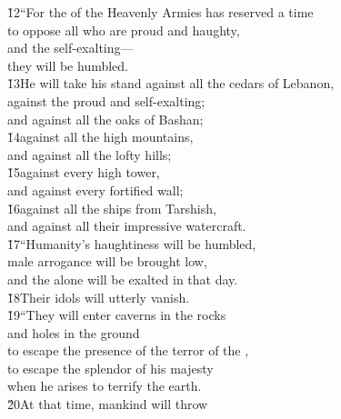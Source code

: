 \begin{poetry}
\poeml \v{12}``For the  of the Heavenly Armies has reserved a time \\
\poemll    to oppose all who are proud and haughty, \\
\poeml and the self-exalting--- \\
\poemll    they will be humbled. \\
\poeml \v{13}He will take his stand against all the cedars of Lebanon, \\
\poemll    against the proud and self-exalting; \\
\poemlll       and against all the oaks of Bashan; \\
\poeml \v{14}against all the high mountains, \\
\poemll    and against all the lofty hills; \\
\poeml \v{15}against every high tower, \\
\poemll    and against every fortified wall; \\
\poeml \v{16}against all the ships from Tarshish, \\
\poemll    and against all their impressive watercraft. \\
\poeml \v{17}``Humanity's haughtiness will be humbled, \\
\poemll    male arrogance will be brought low, \\
\poeml and the  alone will be exalted in that day. \\
\poeml \v{18}Their idols will utterly vanish. \\
\poeml \v{19}``They will enter caverns in the rocks \\
\poemll    and holes in the ground \\
\poeml to escape the presence of the terror of the , \\
\poemll    to escape the splendor of his majesty \\
\poemlll       when he arises to terrify the earth. \\
\poeml \v{20}At that time, mankind will throw \\

\end{poetry}
